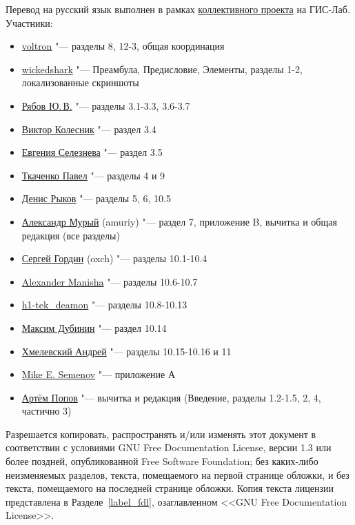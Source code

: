 Перевод на русский язык выполнен в рамках
\href{http://gis-lab.info/docs/qgis/manual15.html}{коллективного проекта}
на ГИС-Лаб. Участники:
\begin{itemize}[label=--]
\item \href{http://gis-lab.info/forum/memberlist.php?mode=viewprofile&u=5325}{voltron}
"--- разделы 8, 12-3, общая координация
\item \href{http://gis-lab.info/forum/memberlist.php?mode=viewprofile&u=7967}{wickedshark}
"--- Преамбула, Предисловие, Элементы, разделы 1-2, локализованные скриншоты
\item \href{http://gis-lab.info/forum/memberlist.php?mode=viewprofile&u=7619}{Рябов Ю.\,В.}
"--- разделы 3.1-3.3, 3.6-3.7
\item \href{http://gis-lab.info/forum/memberlist.php?mode=viewprofile&u=9954}{Виктор Колесник}
"--- раздел 3.4
\item \href{http://gis-lab.info/forum/memberlist.php?mode=viewprofile&u=7392}{Евгения Селезнева}
"--- раздел 3.5
\item \href{http://gis-lab.info/forum/memberlist.php?mode=viewprofile&u=8193}{Ткаченко Павел}
"--- разделы 4 и 9
\item \href{http://gis-lab.info/forum/memberlist.php?mode=viewprofile&u=6901}{Денис Рыков}
"--- разделы 5, 6, 10.5
\item \href{http://gis-lab.info/forum/memberlist.php?mode=viewprofile&u=8430}{Александр Мурый} (amuriy)
"--- раздел 7, приложение B, вычитка и общая редакция (все разделы)
\item \href{http://gis-lab.info/forum/memberlist.php?mode=viewprofile&u=9129}{Сергей Гордин} (oxch)
"--- разделы 10.1-10.4
\item \href{http://gis-lab.info/forum/memberlist.php?mode=viewprofile&u=1394}{Alexander Manisha}
"--- разделы 10.6-10.7
\item \href{http://gis-lab.info/forum/memberlist.php?mode=viewprofile&u=9850}{h1-tek\_deamon}
"--- разделы 10.8-10.13
\item \href{http://gis-lab.info/forum/memberlist.php?mode=viewprofile&u=2}{Максим Дубинин}
"--- раздел 10.14
\item \href{http://gis-lab.info/forum/memberlist.php?mode=viewprofile&u=9719}{Хмелевский Андрей}
"--- разделы 10.15-10.16 и 11
\item \href{http://gis-lab.info/forum/memberlist.php?mode=viewprofile&u=9876}{Mike E. Semenov}
"--- приложение А
\item \href{http://gis-lab.info/forum/memberlist.php?mode=viewprofile&u=7246}{Артём Попов}
"--- вычитка и редакция (Введение, разделы 1.2-1.5, 2, 4, частично 3)
\end{itemize}


Разрешается копировать, распространять и/или изменять этот документ в
соответствии с условиями GNU Free Documentation License, версии 1.3 или
более поздней, опубликованной Free Software Foundation; без каких-либо
неизменяемых разделов, текста, помещаемого на первой странице обложки, и
без текста, помещаемого на последней странице обложки. Копия текста
лицензии представлена в Разделе~\ref{label_fdl}, озаглавленном <<GNU Free
Documentation License>>.

\newpage
